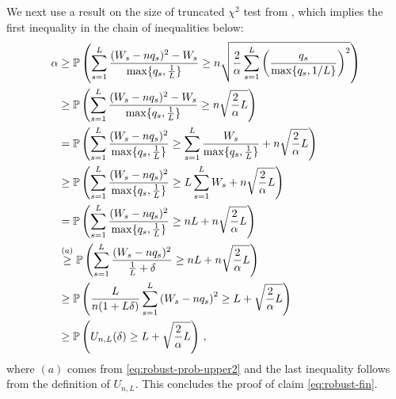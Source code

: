 \documentclass[11pt]{article}
\begin{document}
	We next use a result on the size of truncated $\chi^2$ test from \cite[Theorem 3.2]{balakrishnan2019hypothesis}, which implies the first inequality in the chain of inequalities below:
	\begin{align*}
		\alpha&\geq {\mathbb P}\left(\sum\limits_{s=1}^{L} \frac{(W_s-nq_s)^2-W_s}{\max\{q_s,\frac{1}{L} \}} \geq n\sqrt{ \frac{2}{\alpha} \sum\limits_{s=1}^{L} \left( \frac{q_s}{\max\{q_s,1/L \}} \right)^2 }    \right)\\
		&\geq {\mathbb P}\left(\sum\limits_{s=1}^{L} \frac{(W_s-nq_s)^2-W_s}{\max\{q_s,\frac{1}{L} \}} \geq n\sqrt{ \frac{2}{\alpha}L}     \right)\\
		&= {\mathbb P} \left(\sum\limits_{s=1}^{L} \frac{(W_s-nq_s)^2}{\max\{q_s,\frac{1}{L} \}} \geq \sum\limits_{s=1}^{L}\frac{W_s}{\max\{q_s,\frac{1}{L} \}} + n\sqrt{ \frac{2}{\alpha}L}     \right)\\\
		&\geq {\mathbb P} \left( \sum\limits_{s=1}^{L} \frac{(W_s-nq_s)^2}{\max\{q_s,\frac{1}{L} \}} \geq L\sum\limits_{s=1}^{L}{W_s} +n\sqrt{ \frac{2}{\alpha}L}     \right)\\
		&={\mathbb P} \left(\sum\limits_{s=1}^{L} \frac{(W_s-nq_s)^2}{\max\{q_s,\frac{1}{L} \}} \geq n L+n\sqrt{ \frac{2}{\alpha}L}     \right)\\
		&\overset{(a)}{\geq} {\mathbb P} \left( \sum\limits_{s=1}^{L} \frac{(W_s-nq_s)^2}{\frac{1}{L}+\delta } \geq n L+n\sqrt{ \frac{2}{\alpha}L}     \right)\\
		&\geq  {\mathbb P}\left( \frac{L}{n(1+L\delta)}\sum\limits_{s=1}^{L}{\left(W_s-nq_s\right)^2}  \geq  L+\sqrt{ \frac{2}{\alpha}L}   \right)\\
		&\geq  {\mathbb P}\left( U_{n,L}(\delta)  \geq  L+\sqrt{ \frac{2}{\alpha}L}   \right)\,,
	\end{align*}
	where $(a)$ comes from \eqref{eq:robust-prob-upper2} and the last inequality follows from the definition of $U_{n,L}$. This concludes the proof of claim \eqref{eq:robust-fin}.
	
\end{document}
